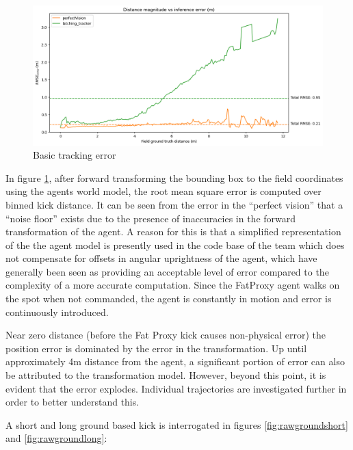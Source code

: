 \documentclass[a4paper,twoside,12pt]{report}
\begin{document}
\begin{figure}[h!]
\begin{center}
\includegraphics[width=13cm]{images/raw_error.png}
\caption{Basic tracking error}
\label{fig:rawerror}
\end{center}
\end{figure}

In figure \ref{fig:rawerror}, after forward transforming the bounding box to the field coordinates using the agents world model, the root mean square error is computed over binned kick distance. It can be seen from the error in the ``perfect vision'' that a ``noise floor'' exists due to the presence of inaccuracies in the forward transformation of the agent. A reason for this is that a simplified representation of the the agent model is presently used in the code base of the team which does not compensate for offsets in angular uprightness of the agent, which have generally been seen as providing an acceptable level of error compared to the complexity of a more accurate computation. Since the FatProxy agent walks on the spot when not commanded, the agent is constantly in motion and error is continuously introduced.

Near zero distance (before the Fat Proxy kick causes non-physical error) the position error is dominated by the error in the transformation. Up until approximately 4m distance from the agent, a significant portion of error can also be attributed to the transformation model. However, beyond this point, it is evident that the error explodes. Individual trajectories are investigated further in order to better understand this.

A short and long ground based kick is interrogated in figures \ref{fig:rawgroundshort} and \ref{fig:rawgroundlong}:
\end{document}
